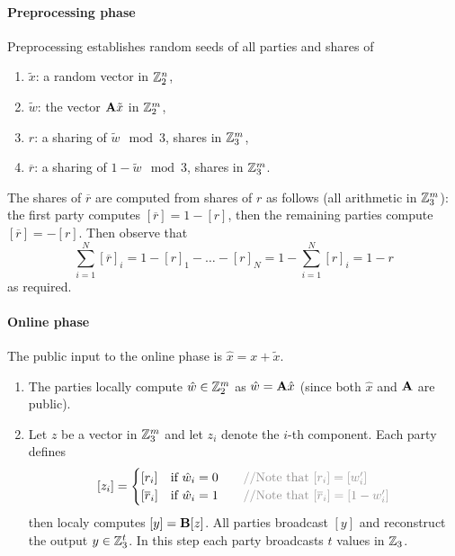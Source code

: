 \paragraph{Preprocessing phase} Preprocessing establishes random seeds of all parties and shares of 
\begin{enumerate}
\item $\tilde{x}$: a random vector in $\mathbb{Z}_2^{n}$,
\item $\tilde{w}$: the vector $\mathbf{A} \tilde{x}$ in $\mathbb{Z}_2^{m}$, 
\item $r$: a sharing of $\tilde{w} \mod 3$, shares in $\mathbb{Z}_3^m$,  
\item $\overline{r}$: a sharing of $1-\tilde{w} \mod 3$, shares in $\mathbb{Z}_3^m$. 
\end{enumerate}
The shares of $\overline{r}$ are computed from shares of $r$ as follows (all arithmetic in $\mathbb{Z}_3^m$): the first
party computes $[\overline{r}] = 1 - [r]$, then the remaining parties compute
$[\overline{r}] = -[r]$.  Then observe that 
\[\sum_{i=1}^N [\overline{r}]_i = 1-[r]_1 - \ldots - [r]_N = 1 - \sum_{i=1}^{N}[r]_i = 1-r \]
 as required. 

\paragraph{Online phase}
The public input to the online phase is $\hat{x} = x + \tilde{x}$. 
\begin{enumerate}

\item The parties locally compute $\hat{w} \in \mathbb{Z}_2^{m}$ as $\hat{w} = \mathbf{A}\hat{x}$ (since both $\hat{x}$ and $\mathbf{A}$ are public). 

\item Let $z$ be a vector in $\mathbb{Z}_3^m$ and let $z_i$ denote the $i$-th component. Each party defines 
\[
    [z_i]  = \begin{cases}
                [r_i]  & \text{if $\hat{w}_i = 0$} \algcomment{\text{Note that $[r_i] = [w_i']$}}\\
                [\overline{r}_i]  & \text{if $\hat{w}_i = 1$} \algcomment{\text{Note that $[\overline{r}_i] = [1- w_i']$}}\\
            \end{cases}
\]
then localy computes $[y] = \mathbf{B}[z]$. All parties broadcast $[y]$ and reconstruct the output $y\in\mathbb{Z}_{3}^t$. 
In this step each party broadcasts $t$ values in $\mathbb{Z}_3$.
\end{enumerate}


